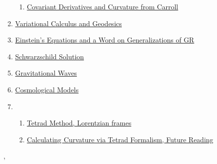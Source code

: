 \documentclass[11pt]{article}
\renewcommand{\today}{\shortmonthname[\the\month] \the \day,  \the\year}
\begin{document}
\begin{enumerate}
\begin{enumerate}
		\item \href{https://mp.weixin.qq.com/s/c3oKvHBUciQ2oVkH20QRvQ}{Covariant Derivatives and Curvature from Carroll}  %
	\end{enumerate}
	\item \href{https://mp.weixin.qq.com/s/YxraoThVHIKJHVI991chjA}{Variational Calculus and Geodesics}  %
	\item \href{https://mp.weixin.qq.com/s/bX1p4282QiqkzcK6jRgPWA}{Einstein's Equations and a Word on Generalizations of GR}  %
	\item \href{https://mp.weixin.qq.com/s/dCVPhYe3qsZXxvVMYEAvYg}{Schwarzschild Solution}  %
	\item \href{https://mp.weixin.qq.com/s/pB1w4j6I0VirVWmtj6oSFw}{Gravitational Waves}  %
	\item \href{https://mp.weixin.qq.com/s/eSJ0X6kVEQibJRMUbnEhSA}{Cosmological Models}  %
	\item 
	\begin{enumerate}
		\item \href{https://mp.weixin.qq.com/s/Wxlfse3LZ41bnL16941PSw}{Tetrad Method, Lorentzian frames}  %
		\item \href{https://mp.weixin.qq.com/s/LDyYlw4aA5lslgVEeogXBw}{Calculating Curvature via Tetrad Formalism, Future Reading}	%
	\end{enumerate}
\end{enumerate}


%
\begin{flushright}
	\tiny \today 
\end{flushright}
\end{document}
